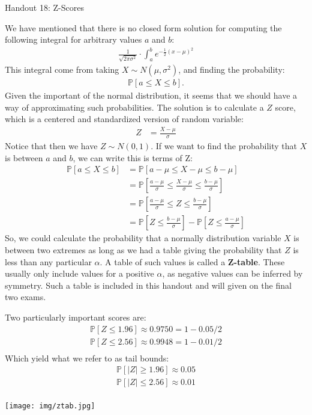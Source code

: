 \documentclass{tufte-handout}
\begin{document}
\justify

{\LARGE Handout 18: Z-Scores}

\vspace*{6pt}

\noindent

We have mentioned that there is no closed form solution for
computing the following integral for arbitrary values $a$ and $b$:
\begin{align*}
\frac{1}{\sqrt{2 \pi \sigma^2}} \cdot \int_{a}^{b} e^{-\frac{1}{2}(x - \mu)^2}
\end{align*}
This integral come from taking $X \sim N(\mu, \sigma^2)$, and
finding the probability:
\begin{align*}
\mathbb{P}\left[ a \leq X \leq b \right].
\end{align*}
Given the important of the normal distribution, it seems that
we should have a way of approximating such probabilities. The
solution is to calculate a $Z$ score, which is a centered and
standardized version of random variable:
\begin{align*}
Z &= \frac{X - \mu}{\sigma}
\end{align*}
Notice that then we have $Z \sim N(0, 1)$. If we want to find
the probability that $X$ is between $a$ and $b$, we can write
this is terms of Z:
\begin{align*}
\mathbb{P} \left[ a \leq X \leq b  \right]
&= \mathbb{P} \left[ a - \mu \leq X - \mu \leq b - \mu  \right] \\
&= \mathbb{P} \left[ \frac{a - \mu}{\sigma} \leq \frac{X - \mu}{\sigma} \leq \frac{b - \mu}{\sigma}  \right] \\
&= \mathbb{P} \left[ \frac{a - \mu}{\sigma} \leq Z \leq \frac{b - \mu}{\sigma}  \right] \\
&= \mathbb{P} \left[ Z \leq \frac{b - \mu}{\sigma} \right] - \mathbb{P} \left[ Z \leq \frac{a - \mu}{\sigma} \right]
\end{align*}
So, we could calculate the probability that a normally distribution
variable $X$ is between two extremes as long as we had a table giving
the probability that $Z$ is less than any particular $\alpha$. A table
of such values is called a \textbf{Z-table}. These usually only include
values for a positive $\alpha$, as negative values can be inferred by
symmetry. Such a table is included in this handout and will given on
the final two exams.

Two particularly important scores are:
\begin{align*}
\mathbb{P}\left[ Z \leq 1.96 \right] \approx 0.9750 = 1 - 0.05/2 \\
\mathbb{P}\left[ Z \leq 2.56 \right] \approx 0.9948 = 1 - 0.01/2 \\
\end{align*}
Which yield what we refer to as tail bounds:
\begin{align*}
\mathbb{P}\left[ |Z| \geq 1.96 \right] \approx 0.05 \\
\mathbb{P}\left[ |Z| \leq 2.56 \right] \approx 0.01 \\
\end{align*}

\texttt{[image: img/ztab.jpg]}
\end{document}
